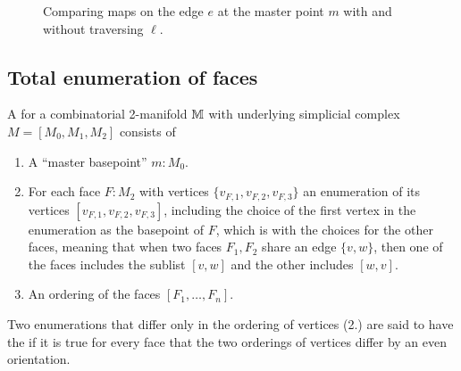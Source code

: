 \begin{figure}[h]
\centering
{}
\caption{Comparing maps on the edge \( e \) at the master point \( m \) with and without traversing \( \ell \).}
\label{fig:lasso}
\end{figure}

\subsection{Total enumeration of faces}
\begin{mydef}
A  for a combinatorial 2-manifold \( \mathbb{M} \) with underlying simplicial complex \( M=[M_0, M_1, M_2] \) consists of
\begin{enumerate}
\item A ``master basepoint'' \( m:M_0 \).
\item For each face \( F:M_2 \) with vertices \( \{v_{F,1}, v_{F,2}, v_{F,3}\} \) an enumeration of its vertices \( [v_{F,1}, v_{F,2}, v_{F,3}] \), including the choice of the first vertex in the enumeration as the basepoint of \( F \), which is  with the choices for the other faces, meaning that when two faces \( F_1,F_2 \) share an edge \( \{v, w\} \), then one of the faces includes the sublist \( [v, w] \) and the other includes \( [w, v] \).
\item An ordering of the faces \( [F_1,\ldots,F_n] \).
\end{enumerate}
Two enumerations that differ only in the ordering of vertices (2.) are said to have the  if it is true for every face that the two orderings of vertices differ by an even orientation.
\end{mydef}

